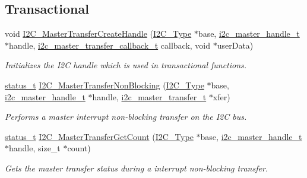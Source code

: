 \subsection*{Transactional}
\begin{DoxyCompactItemize}
\item 
void \mbox{\hyperlink{group__i2c__driver_ga31e3de02b57801c6896e6045c4a31268}{I2\+C\+\_\+\+Master\+Transfer\+Create\+Handle}} (\mbox{\hyperlink{struct_i2_c___type}{I2\+C\+\_\+\+Type}} $\ast$base, \mbox{\hyperlink{group__i2c__driver_ga2fd51f58b8cfd309be985bce4b817fdc}{i2c\+\_\+master\+\_\+handle\+\_\+t}} $\ast$handle, \mbox{\hyperlink{group__i2c__driver_gafa39d30cd808d79b774361874f227204}{i2c\+\_\+master\+\_\+transfer\+\_\+callback\+\_\+t}} callback, void $\ast$user\+Data)
\begin{DoxyCompactList}\small\item\em Initializes the I2C handle which is used in transactional functions. \end{DoxyCompactList}\item 
\mbox{\hyperlink{group__ksdk__common_gaaabdaf7ee58ca7269bd4bf24efcde092}{status\+\_\+t}} \mbox{\hyperlink{group__i2c__driver_gac7f76a04b6f6873c52ad176d58901fe9}{I2\+C\+\_\+\+Master\+Transfer\+Non\+Blocking}} (\mbox{\hyperlink{struct_i2_c___type}{I2\+C\+\_\+\+Type}} $\ast$base, \mbox{\hyperlink{group__i2c__driver_ga2fd51f58b8cfd309be985bce4b817fdc}{i2c\+\_\+master\+\_\+handle\+\_\+t}} $\ast$handle, \mbox{\hyperlink{group__i2c__driver_ga0e25c3c153992361c8d359a86b70d3c6}{i2c\+\_\+master\+\_\+transfer\+\_\+t}} $\ast$xfer)
\begin{DoxyCompactList}\small\item\em Performs a master interrupt non-\/blocking transfer on the I2C bus. \end{DoxyCompactList}\item 
\mbox{\hyperlink{group__ksdk__common_gaaabdaf7ee58ca7269bd4bf24efcde092}{status\+\_\+t}} \mbox{\hyperlink{group__i2c__driver_ga7d720842e68161d2d52d56d119f20665}{I2\+C\+\_\+\+Master\+Transfer\+Get\+Count}} (\mbox{\hyperlink{struct_i2_c___type}{I2\+C\+\_\+\+Type}} $\ast$base, \mbox{\hyperlink{group__i2c__driver_ga2fd51f58b8cfd309be985bce4b817fdc}{i2c\+\_\+master\+\_\+handle\+\_\+t}} $\ast$handle, size\+\_\+t $\ast$count)
\begin{DoxyCompactList}\small\item\em Gets the master transfer status during a interrupt non-\/blocking transfer. \end{DoxyCompactList}\item 

\end{DoxyCompactItemize}
